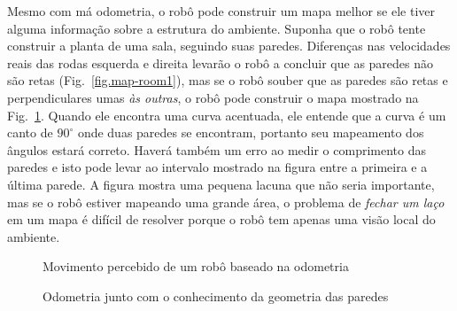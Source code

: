 Mesmo com má odometria, o robô pode construir um mapa melhor se ele tiver alguma informação sobre a estrutura do ambiente. Suponha que o robô tente construir a planta de uma sala, seguindo suas paredes. Diferenças nas velocidades reais das rodas esquerda e direita levarão o robô a concluir que as paredes não são retas (Fig.~\ref{fig.map-room1}), mas se o robô souber que as paredes são retas e perpendiculares umas \emph{às outras}, o robô pode construir o mapa mostrado na Fig.~\ref{fig.map-room2}. Quando ele encontra uma curva acentuada, ele entende que a curva é um canto de $90^\circ$ onde duas paredes se encontram, portanto seu mapeamento dos ângulos estará correto. Haverá também um erro ao medir o comprimento das paredes e isto pode levar ao intervalo mostrado na figura entre a primeira e a última parede. A figura mostra uma pequena lacuna que não seria importante, mas se o robô estiver mapeando uma grande área, o problema de \emph{fechar um laço} em um mapa é difícil de resolver porque o robô tem apenas uma visão local do ambiente.

\begin{figure}
\begin{minipage}{.45\textwidth}
\caption{Movimento percebido de um robô baseado na odometria}
\label{fig.map-room1}
\end{minipage}
\hspace{\fill}
\begin{minipage}{.45\textwidth}
\caption{Odometria junto com o conhecimento da geometria das paredes}
\label{fig.map-room2}
\end{minipage}
\end{figure}

